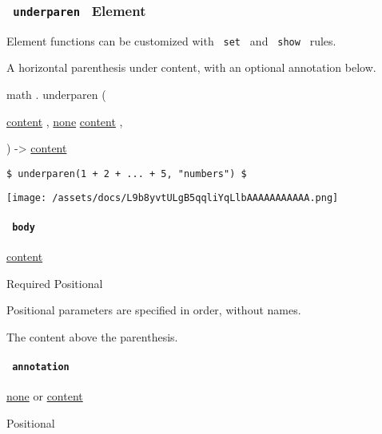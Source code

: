 \subsubsection{\texorpdfstring{\texttt{\ underparen\ } {{ Element
}}}{ underparen   Element }}\label{functions-underparen}

\label{functions-underparen-element-tooltip}
Element functions can be customized with \texttt{\ set\ } and
\texttt{\ show\ } rules.

A horizontal parenthesis under content, with an optional annotation
below.

math { . } { underparen } (

{ \href{/docs/reference/foundations/content/}{content} , } {
\hyperref[functions-underparen-parameters-annotation]{}
\href{/docs/reference/foundations/none/}{none}
\href{/docs/reference/foundations/content/}{content} , }

) -\textgreater{} \href{/docs/reference/foundations/content/}{content}

\begin{verbatim}
$ underparen(1 + 2 + ... + 5, "numbers") $
\end{verbatim}

\texttt{[image: /assets/docs/L9b8yvtULgB5qqliYqLlbAAAAAAAAAAA.png]}

\paragraph{\texorpdfstring{\texttt{\ body\ }}{ body }}\label{functions-underparen-body}

\href{/docs/reference/foundations/content/}{content}

{Required} {{ Positional }}

\label{functions-underparen-body-positional-tooltip}
Positional parameters are specified in order, without names.

The content above the parenthesis.

\paragraph{\texorpdfstring{\texttt{\ annotation\ }}{ annotation }}\label{functions-underparen-annotation}

\href{/docs/reference/foundations/none/}{none} {or}
\href{/docs/reference/foundations/content/}{content}

{{ Positional }}

